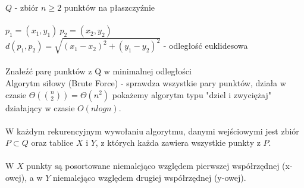 $Q$ - zbiór $n\geq 2$ punktów na płaszczyźnie \\
\\
\tab $p_1= (x_1,y_1)\ p_2= (x_2,y_2)$ \\
\tab $d(p_1,p_2)= \sqrt{(x_1-x_2)^2+(y_1-y_2)^2}$ - odległość euklidesowa\\
\\
\tab Znaleźć parę punktów z Q w minimalnej odległości\\
Algorytm siłowy (Brute Force) - sprawdza wszystkie pary punktów, działa w czasie $\Theta(\binom{n}{2})=\Theta(n^2)$ pokażemy algorytm typu "dziel i zwyciężaj" działający w czasie $O(nlogn)$.\\
\\
W każdym rekurencyjnym wywołaniu algorytmu, danymi wejściowymi jest zbiór $P\subset Q$ oraz tablice $X$ i $Y$, z których każda zawiera wszystkie punkty z $P$.\\
\\
W $X$ punkty są posortowane niemalejąco względem pierwszej współrzędnej (x-owej), a w $Y$ niemalejąco względem drugiej współrzędnej (y-owej).

